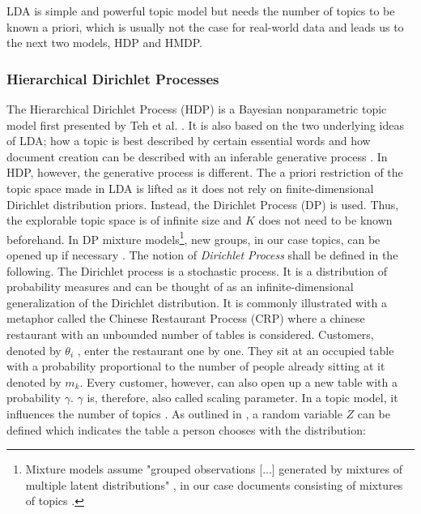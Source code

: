 LDA is simple and powerful topic model \cite{Blei:2012:PTM:2133806.2133826} but needs the number of topics to be known a priori, which is usually not the case for real-world data \cite{wallach08} and leads us to the next two models, HDP and HMDP.
\subsubsection{Hierarchical Dirichlet Processes}
The Hierarchical Dirichlet Process (HDP) is a Bayesian nonparametric topic model first presented by Teh et al. \cite{Teh04hierarchicaldirichlet}.
It is also based on the two underlying ideas of LDA; how a topic is best described by certain essential words \cite{Crain2012} and how document creation can be described with an inferable generative process \cite{DBLP:journals/jmlr/BleiNJ03}. In HDP, however, the generative process is different. The a priori restriction of the topic space made in LDA is lifted as it does not rely on finite-dimensional \cite{frigyik2010introduction} Dirichlet distribution priors. Instead, the Dirichlet Process (DP) \cite{ferguson73} is used. Thus, the explorable topic space is of infinite size \cite{Teh04hierarchicaldirichlet} and $K$ does not need to be known beforehand. In DP mixture models\footnote{Mixture models assume "grouped observations [...] generated by mixtures of multiple latent distributions" \cite{DBLP:phd/dnb/Kling16}, in our case documents consisting of mixtures of topics \cite{DBLP:phd/dnb/Kling16}.}, new groups, in our case topics, can be opened up if necessary \cite{Teh04hierarchicaldirichlet}. The notion of \textit{Dirichlet Process} shall be defined in the following.
The Dirichlet process \cite{ferguson73} is a stochastic process. It is a distribution of probability measures and can be thought of as an infinite-dimensional generalization of the Dirichlet distribution. It is commonly illustrated with a metaphor called the Chinese Restaurant Process (CRP) \cite{me22} where a chinese restaurant with an unbounded number of tables is considered. Customers, denoted by $\theta_i$ \cite{Teh04hierarchicaldirichlet}, enter the restaurant one by one. They sit at an occupied table with a probability proportional to the number of people already sitting at it denoted by $m_k$. Every customer, however, can also open up a new table with a probability $\gamma$. $\gamma$ is, therefore, also called scaling parameter. In a topic model, it influences the number of topics \cite{DBLP:phd/dnb/Kling16}. As outlined in \cite{DBLP:phd/dnb/Kling16}, a random variable $Z$ can be defined which indicates the table a person chooses with the distribution:
